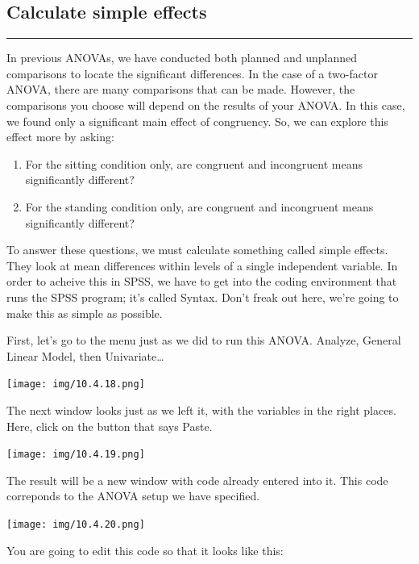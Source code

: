 \documentclass[
]{book}
\providecommand{\tightlist}{%
  \setlength{\itemsep}{0pt}\setlength{\parskip}{0pt}}
\begin{document}
\hypertarget{calculate-simple-effects}{%
\subsection{Calculate simple effects}\label{calculate-simple-effects}}

\begin{center}\rule{0.5\linewidth}{0.5pt}\end{center}

In previous ANOVAs, we have conducted both planned and unplanned comparisons to locate the significant differences. In the case of a two-factor ANOVA, there are many comparisons that can be made. However, the comparisons you choose will depend on the results of your ANOVA. In this case, we found only a significant main effect of congruency. So, we can explore this effect more by asking:

\begin{enumerate}
\def\labelenumi{\arabic{enumi}.}
\tightlist
\item
  For the sitting condition only, are congruent and incongruent means significantly different?
\item
  For the standing condition only, are congruent and incongruent means significantly different?
\end{enumerate}

To answer these questions, we must calculate something called simple effects. They look at mean differences within levels of a single independent variable. In order to acheive this in SPSS, we have to get into the coding environment that runs the SPSS program; it's called Syntax. Don't freak out here, we're going to make this as simple as possible.

First, let's go to the menu just as we did to run this ANOVA. {Analyze}, {General Linear Model}, then {Univariate\ldots{}}

\texttt{[image: img/10.4.18.png]}

The next window looks just as we left it, with the variables in the right places. Here, click on the button that says {Paste}.

\texttt{[image: img/10.4.19.png]}

The result will be a new window with code already entered into it. This code correponds to the ANOVA setup we have specified.

\texttt{[image: img/10.4.20.png]}

You are going to edit this code so that it looks like this:
\end{document}
